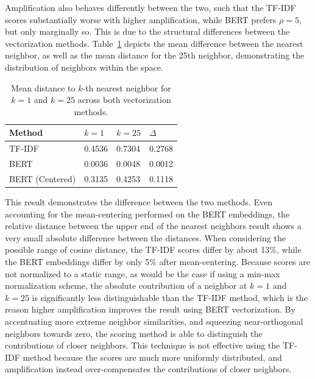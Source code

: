 \documentclass[11pt]{article}
\theoremstyle{plain}
\theoremstyle{definition}
\begin{document}
Amplification also behaves differently between the two, such that the TF-IDF scores substantially worse with higher amplification, while BERT prefers $\rho=5$, but only marginally so. This is due to the structural differences between the vectorization methods. Table~\ref{tab:mean_distance_at} depicts the mean difference between the nearest neighbor, as well as the mean distance for the 25th neighbor, demonstrating the distribution of neighbors within the space.

\begin{table}
    \centering
    \begin{tabular}{| m{10em} | m{3em} | m{3em} | m{3em} |}
        \hline
        Method          & $k=1$  & $k=25$ & $\Delta$ \\
        \hline
        \hline
        TF-IDF          & 0.4536 & 0.7304 & 0.2768   \\
        \hline
        BERT            & 0.0036 & 0.0048 & 0.0012   \\
        \hline
        BERT (Centered) & 0.3135 & 0.4253 & 0.1118   \\
        \hline
    \end{tabular}
    \caption{Mean distance to $k$-th nearest neighbor for $k=1$ and $k=25$ across both vectorization methods.}\label{tab:mean_distance_at}
\end{table}

This result demonstrates the difference between the two methods. Even accounting for the mean-centering performed on the BERT embeddings, the relative distance between the upper end of the nearest neighbors result shows a very small absolute difference between the distances. When considering the possible range of cosine distance, the TF-IDF scores differ by about 13\%, while the BERT embeddings differ by only 5\% after mean-centering. Because scores are not normalized to a static range, as would be the case if using a min-max normalization scheme, the absolute contribution of a neighbor at $k=1$ and $k=25$ is significantly less distinguishable than the TF-IDF method, which is the reason higher amplification improves the result using BERT vectorization. By accentuating more extreme neighbor similarities, and squeezing near-orthogonal neighbors towards zero, the scoring method is able to distinguish the contributions of closer neighbors. This technique is not effective using the TF-IDF method because the scores are much more uniformly distributed, and amplification instead over-compensates the contributions of closer neighbors.
\end{document}
